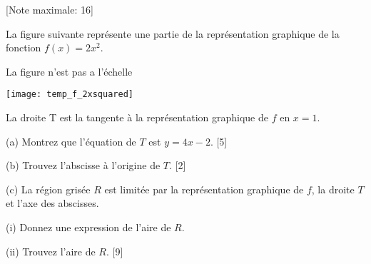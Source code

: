 \begin{question}
  \hspace*{\fill} [Note maximale: 16]\par
  \medskip
  \noindent La figure suivante représente une partie de la représentation graphique de la fonction $f(x) = 2x^2$.\par
  \medskip
  \begin{center}
    \noindent La figure n'est pas a l'échelle\par
    \texttt{[image: temp\_f\_2xsquared]}\par
  \end{center}
  \medskip
  \noindent La droite T est la tangente à la représentation graphique de $f$ en $x = 1$.\par
  \medskip
  (a) Montrez que l’équation de $T$ est $y = 4x - 2$.\hspace*{\fill} [5]\par
  \medskip
  (b) Trouvez l’abscisse à l’origine de $T$.\hspace*{\fill} [2]\par
  \medskip
  (c) La région grisée $R$ est limitée par la représentation graphique de $f$, la droite $T$ et l’axe des abscisses.\par
  \hspace{1em}(i)  Donnez une expression de l’aire de $R$.\par
  \hspace{1em}(ii) Trouvez l’aire de $R$.\hspace*{\fill} [9]\par
  \medskip
\end{question}


